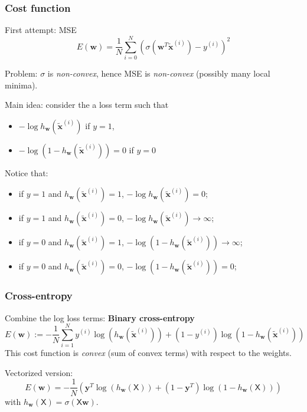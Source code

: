 \documentclass{beamer}
\begin{document}
	\begin{frame}
		\frametitle{Cost function}
		
		First attempt: MSE
		\begin{equation*}
			E(\bm{w}) = \frac{1}{N} \sum_{i= 0}^{N} (\sigma(\bm{w}^T\tilde{\bm{x}}^{(i)}) - y^{(i)})^2
		\end{equation*}
		
		Problem: $\sigma$ is \textsl{non-convex}, hence MSE is \textsl{non-convex} (possibly many local minima).
		
		\vspace{5mm}
		
		Main idea: consider the a loss term such that 
		
		\begin{itemize}
			\item $-\log h_{\bm{w}}(\tilde{\bm{x}}^{(i)})$ if $y=1$, 
			\item $-\log (1-h_{\bm{w}}(\tilde{\bm{x}}^{(i)})) = 0$ if $y=0$
		\end{itemize}
		
		Notice that:
		\begin{itemize}
			\item if $y=1$ and $h_{\bm{w}}(\tilde{\bm{x}}^{(i)}) = 1$, $-\log h_{\bm{w}}(\tilde{\bm{x}}^{(i)}) = 0$;
			\item if $y=1$ and $h_{\bm{w}}(\tilde{\bm{x}}^{(i)}) = 0$, $-\log h_{\bm{w}}(\tilde{\bm{x}}^{(i)}) \rightarrow \infty$;
			\item if $y=0$ and $h_{\bm{w}}(\tilde{\bm{x}}^{(i)}) = 1$, $-\log (1-h_{\bm{w}}(\tilde{\bm{x}}^{(i)})) \rightarrow \infty$;
			\item if $y=0$ and $h_{\bm{w}}(\tilde{\bm{x}}^{(i)}) = 0$, $-\log (1-h_{\bm{w}}(\tilde{\bm{x}}^{(i)})) = 0$;
		\end{itemize}

	\end{frame}
	
	\begin{frame}
		\frametitle{Cross-entropy}
		Combine the log loss terms: \textbf{Binary cross-entropy}
		\begin{equation*}
			E(\bm{w}) := - \frac{1}{N} \sum_{i=1}^{N} y^{(i)}\log(h_{\bm{w}}(\tilde{\bm{x}}^{(i)})) + (1-y^{(i)})\log(1-h_{\bm{w}}(\tilde{\bm{x}}^{(i)}))
		\end{equation*}
		This cost function is \textit{convex} (sum of convex terms) with respect to the weights.
		
		\vspace{5mm}
		Vectorized version:
		\begin{equation*}
			E(\bm{w}) = - \frac{1}{N} \left(\bm{y}^T\log (h_{\bm{w}}(\mathsf{X})) + (1-\bm{y}^T)\log(1-h_{\bm{w}}(\mathsf{X}))\right)
		\end{equation*}
		with $h_{\bm{w}}(\mathsf{X}) = \sigma(\mathsf{X}\bm{w})$.
	\end{frame}
\end{document}
